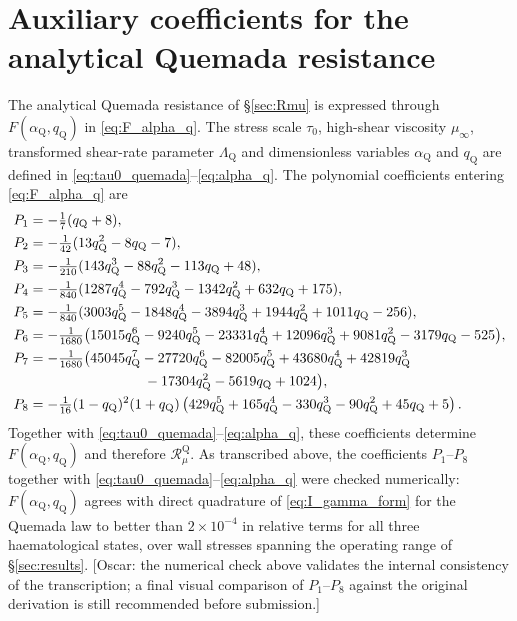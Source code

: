 \documentclass[lineno]{jfm}
\begin{document}
\section{Auxiliary coefficients for the analytical Quemada resistance}
\label{appB}
The analytical Quemada resistance of \S\ref{sec:Rmu} is expressed through
$F(\alpha_{\mathrm Q},q_{\mathrm Q})$ in \eqref{eq:F_alpha_q}. The stress
scale $\tau_0$, high-shear viscosity $\mu_\infty$, transformed shear-rate
parameter $\Lambda_{\mathrm Q}$ and dimensionless variables
$\alpha_{\mathrm Q}$ and $q_{\mathrm Q}$ are defined in
\eqref{eq:tau0_quemada}--\eqref{eq:alpha_q}.
The polynomial coefficients entering \eqref{eq:F_alpha_q} are
\begin{align}
P_1
&=
-\tfrac{1}{7}(q_{\mathrm Q}+8),
\\
P_2
&=
-\tfrac{1}{42}
(13q_{\mathrm Q}^2-8q_{\mathrm Q}-7),
\\
P_3
&=
-\tfrac{1}{210}
(143q_{\mathrm Q}^3-88q_{\mathrm Q}^2-113q_{\mathrm Q}+48),
\\
P_4
&=
-\tfrac{1}{840}
(1287q_{\mathrm Q}^4-792q_{\mathrm Q}^3
-1342q_{\mathrm Q}^2+632q_{\mathrm Q}+175),
\\
P_5
&=
-\tfrac{1}{840}
(3003q_{\mathrm Q}^5-1848q_{\mathrm Q}^4
-3894q_{\mathrm Q}^3+1944q_{\mathrm Q}^2
+1011q_{\mathrm Q}-256),
\\
P_6
&=
-\tfrac{1}{1680}
\bigl(
15015q_{\mathrm Q}^6-9240q_{\mathrm Q}^5
-23331q_{\mathrm Q}^4+12096q_{\mathrm Q}^3
+9081q_{\mathrm Q}^2-3179q_{\mathrm Q}-525
\bigr),
\\
P_7
&=
-\tfrac{1}{1680}
\bigl(
45045q_{\mathrm Q}^7-27720q_{\mathrm Q}^6
-82005q_{\mathrm Q}^5+43680q_{\mathrm Q}^4
+42819q_{\mathrm Q}^3
\nonumber\\
&\hspace{2.9cm}
-17304q_{\mathrm Q}^2-5619q_{\mathrm Q}+1024
\bigr),
\\
P_8
&=
-\tfrac{1}{16}
(1-q_{\mathrm Q})^2(1+q_{\mathrm Q})
\left(
429q_{\mathrm Q}^5
+165q_{\mathrm Q}^4
-330q_{\mathrm Q}^3
-90q_{\mathrm Q}^2
+45q_{\mathrm Q}+5
\right).
\end{align}
Together with
\eqref{eq:tau0_quemada}--\eqref{eq:alpha_q}, these coefficients determine
$F(\alpha_{\mathrm Q},q_{\mathrm Q})$ and therefore
$\mathcal{R}_{\mu}^{\mathrm Q}$.
As transcribed above, the coefficients $P_1$--$P_8$ together with
\eqref{eq:tau0_quemada}--\eqref{eq:alpha_q} were checked numerically:
$F(\alpha_{\mathrm Q},q_{\mathrm Q})$ agrees with direct quadrature of
\eqref{eq:I_gamma_form} for the Quemada law to better than
$2\times10^{-4}$ in relative terms for all three haematological states, over
wall stresses spanning the operating range of \S\ref{sec:results}.
{\color{red}[Oscar: the numerical check above validates the internal
consistency of the transcription; a final visual comparison of
$P_1$--$P_8$ against the original \citet{Popel1993} derivation is still
recommended before submission.]}


\end{document}
